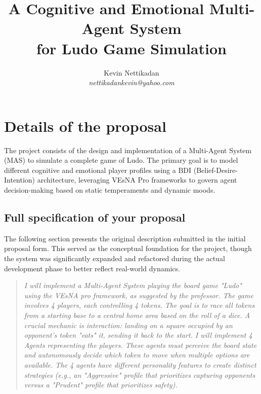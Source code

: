 \documentclass[12pt]{article}
\begin{document}
\title{A Cognitive and Emotional Multi-Agent System\\ for Ludo Game Simulation}
\author{Kevin Nettikadan\\
{\em nettikadankevin@yahoo.com}}
\maketitle             

\section{Details of the proposal}
\label{sec:yourProposal}
The project consists of the design and implementation of a Multi-Agent System (MAS) to simulate a complete game of Ludo.
The primary goal is to model different cognitive and emotional player profiles using a BDI (Belief-Desire-Intention) architecture, leveraging VEsNA Pro frameworks to govern agent decision-making based on static temperaments and dynamic moods.
\subsection{Full specification of your proposal}
\label{subsec:specification}
The following section presents the original description submitted in the initial proposal form. This served as the conceptual foundation for the project, though the system was significantly expanded and refactored during the actual development phase to better reflect real-world dynamics.

\begin{quote}
\textit{I will implement a Multi-Agent System playing the board game "Ludo" using the VEsNA pro framework, as suggested by the professor. The game involves 4 players, each controlling 4 tokens. The goal is to race all tokens from a starting base to a central home area based on the roll of a dice. A crucial mechanic is interaction: landing on a square occupied by an opponent's token "eats" it, sending it back to the start. I will implement 4 Agents representing the players. These agents must perceive the board state and autonomously decide which token to move when multiple options are available. The 4 agents have different personality features to create distinct strategies (e.g., an "Aggressive" profile that prioritizes capturing opponents versus a "Prudent" profile that prioritizes safety).}
\end{quote}
\end{document}
